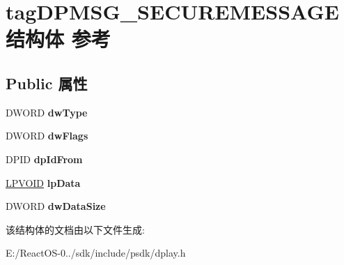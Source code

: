 \hypertarget{structtag_d_p_m_s_g___s_e_c_u_r_e_m_e_s_s_a_g_e}{}\section{tag\+D\+P\+M\+S\+G\+\_\+\+S\+E\+C\+U\+R\+E\+M\+E\+S\+S\+A\+G\+E结构体 参考}
\label{structtag_d_p_m_s_g___s_e_c_u_r_e_m_e_s_s_a_g_e}
\subsection*{Public 属性}
\begin{DoxyCompactItemize}
\item 
\mbox{\label{structtag_d_p_m_s_g___s_e_c_u_r_e_m_e_s_s_a_g_e_a328f585bcd09897c30a88175a3584db9}} 
D\+W\+O\+RD {\bfseries dw\+Type}
\item 
\mbox{\label{structtag_d_p_m_s_g___s_e_c_u_r_e_m_e_s_s_a_g_e_a6075e421ddf74e8b16d96fdc25a39dd8}} 
D\+W\+O\+RD {\bfseries dw\+Flags}
\item 
\mbox{\label{structtag_d_p_m_s_g___s_e_c_u_r_e_m_e_s_s_a_g_e_aa641f7daf7b98d0b1f7821ab15408fb4}} 
D\+P\+ID {\bfseries dp\+Id\+From}
\item 
\mbox{\label{structtag_d_p_m_s_g___s_e_c_u_r_e_m_e_s_s_a_g_e_a2c37147ea38ecd90b902ef5095faf3d0}} 
\hyperlink{interfacevoid}{L\+P\+V\+O\+ID} {\bfseries lp\+Data}
\item 
\mbox{\label{structtag_d_p_m_s_g___s_e_c_u_r_e_m_e_s_s_a_g_e_a6fa07cda895adc1d1dd7a85841d5e7ac}} 
D\+W\+O\+RD {\bfseries dw\+Data\+Size}
\end{DoxyCompactItemize}


该结构体的文档由以下文件生成\+:\begin{DoxyCompactItemize}
\item 
E\+:/\+React\+O\+S-\/0../sdk/include/psdk/dplay.\+h\end{DoxyCompactItemize}
